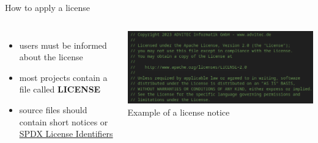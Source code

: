 \documentclass[10pt, graphics, aspectratio=169, table]{beamer}
\begin{document}
    \begin{frame}{How to apply a license}
        \begin{columns}
                \begin{itemize}
                    \item users must be informed about the license
                    \item most projects contain a file called \textbf{LICENSE}
                    \item source files should contain short notices or \href{https://spdx.dev/learn/handling-license-info}{SPDX License Identifiers}
                \end{itemize}
                \includegraphics[width=\textwidth]{img/notice_example.png}
                \center\tiny Example of a license notice
        \end{columns}
    \end{frame}
\end{document}
